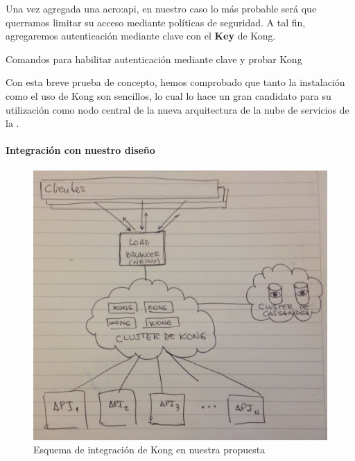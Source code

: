 Una vez agregada una \gls{acro:api}, en nuestro caso lo más probable será que querramos limitar su acceso mediante políticas de seguridad. A tal fin, agregaremos autenticación mediante clave con el  \textbf{Key} de Kong.

\begin{listing}[H]
  \caption{Comandos para habilitar autenticación mediante clave y probar Kong}
  \label{soa:tecnologias:kong:bash-habilitar-key-auth}
\end{listing}

Con esta breve prueba de concepto, hemos comprobado que tanto la instalación como el uso de Kong son sencillos, lo cual lo hace un gran candidato para su utilización como nodo central de la nueva arquitectura de la nube de servicios de la {\unlp}.

\paragraph{Integración con nuestro diseño}

\begin{figure}
  \includegraphics[width=\linewidth]{src/images/03-capitulo-3/tecnologias/kong/kong-arq.jpg}
  \caption{Esquema de integración de Kong en nuestra propuesta}
  \label{fig:integracion-kong-arquitectura}
\end{figure}

